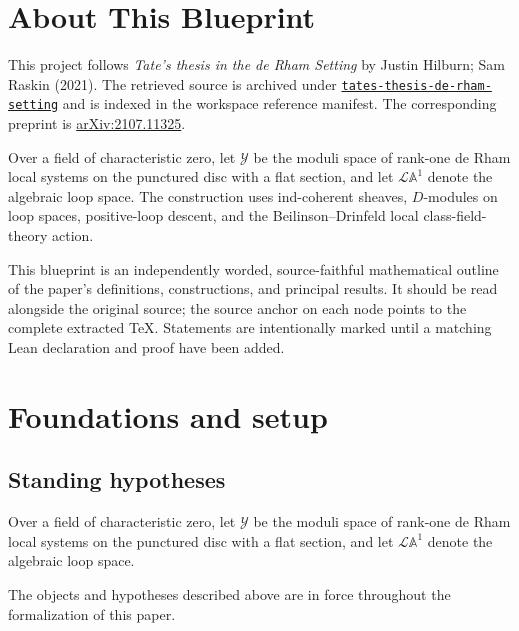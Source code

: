 

\chapter*{About This Blueprint}
\label{tates-thesis-de-rham-setting-about}

This project follows \emph{Tate's thesis in the de Rham Setting} by Justin Hilburn; Sam Raskin (2021). The
retrieved source is archived under
\href{../../../../../references/tates-thesis-de-rham-setting/}{\texttt{tates-thesis-de-rham-setting}} and is indexed in
the workspace reference manifest. The corresponding preprint is
\href{https://arxiv.org/abs/2107.11325}{arXiv:2107.11325}.

Over a field of characteristic zero, let $\mathcal Y$ be the moduli space of rank-one de Rham local systems on the punctured disc with a flat section, and let $\mathcal L\mathbb A^1$ denote the algebraic loop space. The construction uses ind-coherent sheaves, $D$-modules on loop spaces, positive-loop descent, and the Beilinson--Drinfeld local class-field-theory action.

This blueprint is an independently worded, source-faithful mathematical
outline of the paper's definitions, constructions, and principal results. It
should be read alongside the original source; the source anchor on each node
points to the complete extracted TeX. Statements are intentionally marked
\notready until a matching Lean declaration and proof have been added.

\chapter{Foundations and setup}
\label{chap:tates-thesis-de-rham-setting-foundations}

\section{Standing hypotheses}
\label{sec:tates-thesis-de-rham-setting-standing}

Over a field of characteristic zero, let $\mathcal Y$ be the moduli space of rank-one de Rham local systems on the punctured disc with a flat section, and let $\mathcal L\mathbb A^1$ denote the algebraic loop space.

\begin{convention}
\label{tates-thesis-de-rham-setting-setup}
The objects and hypotheses described above are in force throughout the
formalization of this paper.
\notready
\end{convention}

